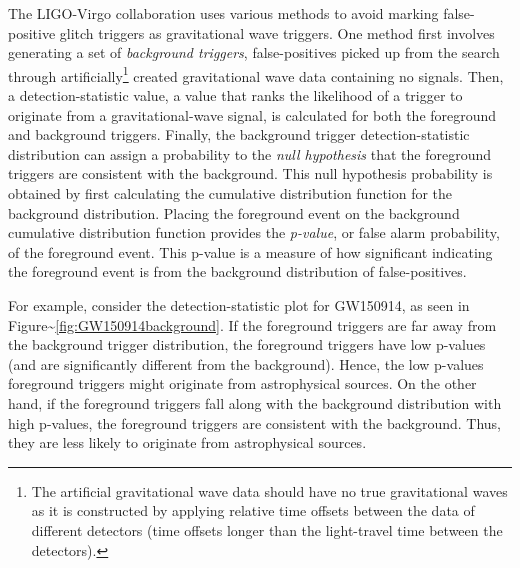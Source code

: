 \documentclass[%
 reprint,
 amsmath,amssymb,
 aps,
]{revtex4-2}
\begin{document}
The LIGO-Virgo collaboration uses various methods to avoid marking false-positive glitch triggers as gravitational wave
triggers. One method first involves generating a set of \emph{background triggers}, false-positives picked up from the search
through artificially\footnote{The artificial gravitational wave data
  should have no true gravitational waves as it is constructed by applying relative time offsets between the data of different detectors (time offsets longer than the light-travel time between the detectors).} created gravitational
wave data containing no signals. Then, a detection-statistic value, a value
that ranks the likelihood of a trigger to originate from a gravitational-wave signal, is calculated for both the
foreground and background triggers. Finally, the background trigger detection-statistic distribution can assign a probability to the \emph{null hypothesis} that the foreground triggers are consistent with the background. This null hypothesis probability is obtained by first calculating the cumulative distribution function for the background distribution. Placing the foreground event on the background cumulative distribution function provides the \emph{p-value}, or false alarm probability, of the foreground event. This p-value is a measure of how significant indicating the foreground event is from the background distribution of false-positives.

For example, consider the
detection-statistic plot for GW150914, as seen in Figure\textasciitilde\ref{fig:GW150914background}. If the
foreground triggers are far away from the background trigger distribution, the foreground triggers have low p-values (and are significantly
different from the background). Hence, the low p-values foreground triggers might originate from astrophysical sources. On the other hand, if the foreground
triggers fall along with the background distribution with high p-values, the foreground triggers are consistent with the background. Thus,
they are less likely to originate from astrophysical sources.
\end{document}
